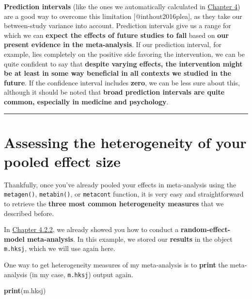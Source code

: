 \documentclass[]{book}
\newenvironment{Shaded}{\begin{snugshade}}{\end{snugshade}}
\newcommand{\KeywordTok}[1]{\textcolor[rgb]{0.13,0.29,0.53}{\textbf{#1}}}
\newcommand{\NormalTok}[1]{#1}
\begin{document}
\begin{rmdachtung}
\textbf{Prediction intervals} (like the ones we automatically calculated
in \protect\hyperlink{pool}{Chapter 4}) are a good way to overcome this
limitation {[}@inthout2016plea{]}, as they take our between-study
variance into account. Prediction intervals give us a range for which we
can \textbf{expect the effects of future studies to fall} based on
\textbf{our present evidence in the meta-analysis}. If our prediction
interval, for example, lies completely on the positive side favoring the
intervention, we can be quite confident to say that \textbf{despite
varying effects, the intervention might be at least in some way
beneficial in all contexts we studied in the future}. If the confidence
interval includes \textbf{zero}, we can be less sure about this,
although it should be noted that \textbf{broad prediction intervals are
quite common, especially in medicine and psychology}.
\end{rmdachtung}

\begin{center}\rule{0.5\linewidth}{\linethickness}\end{center}

\hypertarget{assessing-the-heterogeneity-of-your-pooled-effect-size}{%
\section{Assessing the heterogeneity of your pooled effect size}\label{assessing-the-heterogeneity-of-your-pooled-effect-size}}

Thankfully, once you've already pooled your effects in meta-analysis using the \texttt{metagen()}, \texttt{metabin()}, or \texttt{metacont} function, it is very easy and straightforward to retrieve the \textbf{three most common heterogeneity measures} that we described before.

In \protect\hyperlink{random.precalc}{Chapter 4.2.2}, we already showed you how to conduct a \textbf{random-effect-model meta-analysis}. In this example, we stored our \textbf{results} in the object \texttt{m.hksj}, which we will use again here.

One way to get heterogeneity measures of my meta-analysis is to \textbf{print} the meta-analysis (in my case, \texttt{m.hksj}) output again.

\begin{Shaded}
\begin{Highlighting}[]
\KeywordTok{print}\NormalTok{(m.hksj)}
\end{Highlighting}
\end{Shaded}
\end{document}
